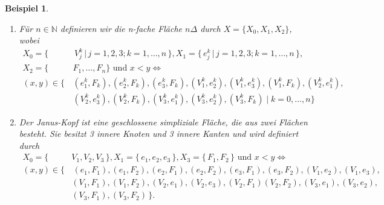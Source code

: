 \documentclass[12pt,titlepage]{article}
\newtheorem{bsp}{Beispiel}[section]
\begin{document}
\begin{bsp}
\begin{enumerate}
\begin{figure}[H]
\caption{Dreieck}
\end{figure}

 \item
 Für $n \in \mathbb{N}$ definieren wir die \emph{n-fache Fläche} $n \Delta$ durch $X=\{X_{0},X_{1},X_{2}\}$, wobei
 \begin{align*}
  X_{0}=\{& \,V_{j}^{k}\,\vert\, j=1,2,3 ;k=1,\ldots,n\,\}, X_{1}=\{\,e_{j}^{k}\,\vert\, j=1,2,3 ;k=1,\ldots,n\,\},\\
   X_{2}=\{&F_{1},\ldots,F_{n}\} \text{ und } x<y \Leftrightarrow \\
 (x,y)\in \{\,&(e_{1}^k,F_{k}),(e_{2}^k,F_{k}),(e_{3}^k,F_{k}),(V_{1}^k,e_{2}^k),(V_{1}^k,e_{3}^k),(V_{1}^k,F_{k}), (V_{2}^k,e_{1}^k),\\ &(V_{2}^k,e_{3}^k),(V_{2}^k,F_{k}),(V_{3}^k,e_{1}^k),(V_{3}^k,e_{2}^k),(V_{3}^k,F_{k})\mid k=0,\ldots,n\} 
\end{align*}
 
 \item 
 Der \emph{Janus-Kopf} ist eine geschlossene simpliziale Fläche, die aus zwei Flächen besteht.	Sie besitzt 3 innere Knoten und  3 innere Kanten und wird definiert durch
 \begin{align*}
 X_{0}=\{\,&V_{1},V_{2},V_{3}\,\} ,X_{1}=\{\,e_{1},e_{2},e_{3}\,\},X_{3}=\{\, F_{1},F_{2}\,\}  \text{ und } x<y \Leftrightarrow \\
 (x,y)\in\{&\,(e_{1},F_{1}),(e_{1},F_{2}),(e_{2},F_{1}),(e_{2},F_{2}),(e_{3},F_{1}),(e_{3},F_{2}),(V_{1},e_{2}),(V_{1},e_{3}),\\ &(V_{1},F_{1}),
  (V_{1},F_{2}),(V_{2},e_{1}),(V_{2},e_{3}),(V_{2},F_{1})
 (V_{2},F_{2}), (V_{3},e_{1}), (V_{3},e_{2}),\\&(V_{3},F_{1}),(V_{3},F_{2}) \,\}.
 \end{align*}


\end{enumerate}
\end{bsp}
\end{document}
